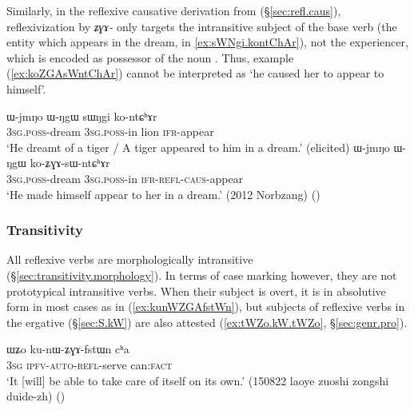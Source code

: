  Similarly, in the reflexive causative derivation  from  (§\ref{sec:refl.caus}), reflexivization by \textit{ʑɣɤ-} only targets the intransitive subject of the base verb (the entity which appears in the dream,  in \ref{ex:sWNgi.kontChAr}), not the experiencer, which is encoded as possessor of the noun . Thus, example (\ref{ex:koZGAsWntChAr}) cannot be interpreted as `he caused her to appear to himself'.
 
\begin{exe}
\ex 
\begin{xlist}
\ex \label{ex:sWNgi.kontChAr}
\gll ɯ-jmŋo ɯ-ŋgɯ sɯŋgi ko-ntɕʰɤr \\
\textsc{3sg}.\textsc{poss}-dream \textsc{3sg}.\textsc{poss}-in lion \textsc{ifr}-appear \\
\glt `He dreamt of a tiger / A tiger appeared to him in a dream.' (elicited)
\ex \label{ex:koZGAsWntChAr}
\gll  ɯ-jmŋo ɯ-ŋgɯ ko-ʑɣɤ-sɯ-ntɕʰɤr    \\
\textsc{3sg}.\textsc{poss}-dream \textsc{3sg}.\textsc{poss}-in \textsc{ifr}-\textsc{refl}-\textsc{caus}-appear  \\
\glt `He made himself appear to her in a dream.' (2012 Norbzang) ()
\end{xlist}
 \end{exe}
 
  \subsubsection{Transitivity} \label{sec:refl.erg}
All reflexive verbs are morphologically intransitive (§\ref{sec:transitivity.morphology}). In terms of case marking however, they are not prototypical intransitive verbs. When their subject is overt, it is in absolutive form in most cases as in (\ref{ex:kunWZGAfstWn}), but subjects of reflexive verbs in the ergative (§\ref{sec:S.kW}) are also attested (\ref{ex:tWZo.kW.tWZo}, §\ref{sec:genr.pro}).

\begin{exe}
\ex \label{ex:kunWZGAfstWn}
 \gll ɯʑo ku-nɯ-ʑɣɤ-fstɯn cʰa \\
 \textsc{3sg} \textsc{ipfv}-\textsc{auto}-\textsc{refl}-serve can:\textsc{fact} \\
 \glt `It [will] be able to take care of itself on its own.' (150822 laoye zuoshi zongshi duide-zh) ()
 \end{exe}

